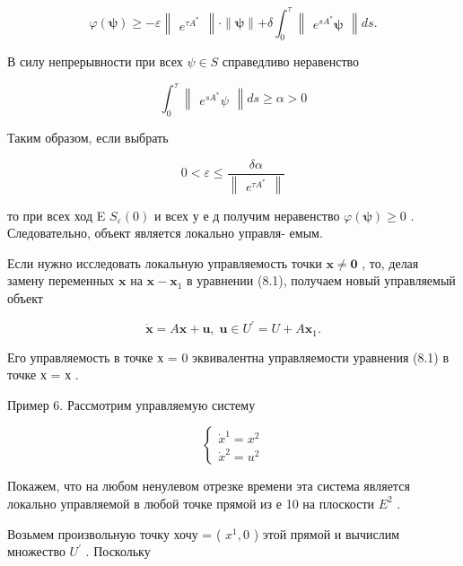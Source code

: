\documentclass[8pt]{extarticle}
\begin{document}
\[
\varphi \left( \mathbf{\psi }\right)  \geq   - \varepsilon \left\lVert \begin{array}{c} {e}^{\tau {A}^{ * }} \end{array} \right\rVert \cdot  \parallel \mathbf{\psi }\parallel  + \delta {\int }_{0}^{\tau }\left\lVert \begin{array}{c} {{e}^{s{A}^{ * }}\mathbf{\psi }} \end{array} \right\rVert{ds}.
\]

В силу непрерывности при всех \(\psi  \in  S\) справедливо неравенство

\[
{\int }_{0}^{\tau }\left\lVert \begin{array}{c} {{e}^{s{A}^{ * }}\psi } \end{array} \right\rVert{ds} \geq  \alpha  > 0
\]

Таким образом, если выбрать

\[
0 < \varepsilon  \leq  \frac{\delta \alpha }{\left\lVert \begin{array}{c} {e}^{\tau {A}^{ * }} \end{array} \right\rVert}
\]

то при всех ход E \({S}_{\varepsilon }\left( 0\right)\) и всех у е д получим неравенство \(\varphi \left( \mathbf{\psi }\right)  \geq  0\) . Следовательно, объект является локально управля- емым.

Если нужно исследовать локальную управляемость точки \(\mathbf{x} \neq  \mathbf{0}\) , то, делая замену переменных \(\mathbf{x}\) на \(\mathbf{x} - {\mathbf{x}}_{1}\) в уравнении (8.1), получаем новый управляемый объект

\[
\dot{\mathbf{x}} = A\mathbf{x} + \mathbf{u},\;\mathbf{u} \in  {U}^{\prime } = U + A{\mathbf{x}}_{1}. \tag{8.19}
\]

Его управляемость в точке х = 0 эквивалентна управляемости уравнения (8.1) в точке х = х .

Пример 6. Рассмотрим управляемую систему

\[
\left\{  \begin{array}{l} {\dot{x}}^{1} = {x}^{2} \\  {\dot{x}}^{2} = {u}^{2} \end{array}\right. \tag{8.20}
\]

Покажем, что на любом ненулевом отрезке времени эта система является локально управляемой в любой точке прямой из е 10 на плоскости \({E}^{2}\) .

Возьмем произвольную точку хочу = ( \({x}^{1},0\) ) этой прямой и вычислим множество \({U}^{\prime }\) . Поскольку
\end{document}
